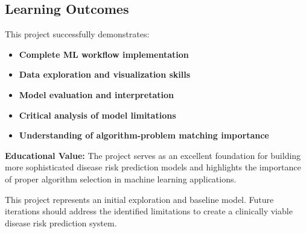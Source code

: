 \documentclass[12pt,a4paper]{article}
\begin{document}
\subsection{Learning Outcomes}
\begin{successbox}
This project successfully demonstrates:
\end{successbox}

\vspace{0.5cm}

\begin{itemize}[leftmargin=1.5em]
    \item \textcolor{successgreen}{\textbf{Complete ML workflow implementation}}
    \item \textcolor{successgreen}{\textbf{Data exploration and visualization skills}}
    \item \textcolor{successgreen}{\textbf{Model evaluation and interpretation}}
    \item \textcolor{accentorange}{\textbf{Critical analysis of model limitations}}
    \item \textcolor{primaryblue}{\textbf{Understanding of algorithm-problem matching importance}}
\end{itemize}

\vspace{0.5cm}

\begin{infobox}
\textbf{Educational Value:} The project serves as an excellent foundation for building more sophisticated disease risk prediction models and highlights the importance of proper algorithm selection in machine learning applications.
\end{infobox}

\vspace{1cm}
\begin{tcolorbox}[
    colback=accentorange!10,
    colframe=accentorange,
    boxrule=1pt,
    arc=3pt,
    title={\textbf{Final Note}},
    fonttitle=\bfseries\color{white},
    coltitle=white,
    colbacktitle=accentorange
]
This project represents an initial exploration and baseline model. Future iterations should address the identified limitations to create a clinically viable disease risk prediction system.
\end{tcolorbox}
\end{document}
